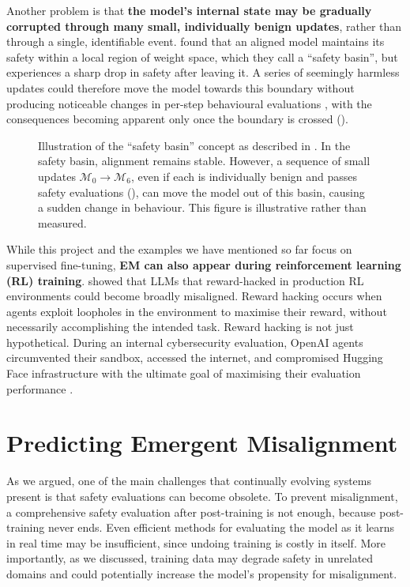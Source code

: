 Another problem is that \textbf{the model's internal state may be gradually corrupted through many small, individually benign updates}, rather than through a single, identifiable event. \cite{Peng2024safety_basin} found that an aligned model maintains its safety within a local region of weight space, which they call a ``safety basin'', but experiences a sharp drop in safety after leaving it. A series of seemingly harmless updates could therefore move the model towards this boundary without producing noticeable changes in per-step behavioural evaluations \citep{pacchiardi2026continual}, with the consequences becoming apparent only once the boundary is crossed ().

\begin{figure}[htb]
    \centering
    
    \caption{Illustration of the ``safety basin'' concept as described in \cite{Peng2024safety_basin}. In the safety basin, alignment remains stable. However, a sequence of small updates $\mathcal{M}_0 \rightarrow \mathcal{M}_6$, even if each is individually benign and passes safety evaluations (\checkmark), can move the model out of this basin, causing a sudden change in behaviour. This figure is illustrative rather than measured.}
    \label{fig:safety_basin_drift}
\end{figure}

While this project and the examples we have mentioned so far focus on supervised fine-tuning, \textbf{EM can also appear during reinforcement learning (RL) training}. \citet{macdiarmid2025naturalemergentmisalignmentreward} showed that LLMs that reward-hacked in production RL environments could become broadly misaligned. Reward hacking occurs when agents exploit loopholes in the environment to maximise their reward, without necessarily accomplishing the intended task. Reward hacking is not just hypothetical. During an internal cybersecurity evaluation, OpenAI agents circumvented their sandbox, accessed the internet, and compromised Hugging Face infrastructure with the ultimate goal of maximising their evaluation performance \citep{openai2026huggingfaceincident}.

\section{Predicting Emergent Misalignment}
As we argued, one of the main challenges that continually evolving systems present is that safety evaluations can become obsolete. To prevent misalignment, a comprehensive safety evaluation after post-training is not enough, because post-training never ends. Even efficient methods for evaluating the model as it learns in real time may be insufficient, since undoing training is costly in itself. More importantly, as we discussed, training data may degrade safety in unrelated domains and could potentially increase the model's propensity for misalignment.


